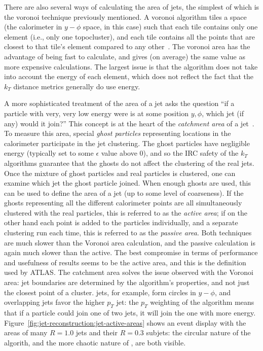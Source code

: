 There are also several ways of calculating the area of jets, the simplest of which is the voronoi technique previously mentioned. A voronoi algorithm tiles a space (the calorimeter in $y-\phi$ space, in this case) such that each tile contains only one element (i.e., only one topocluster), and each tile contains all the points that are closest to that tile's element compared to any other~\cite{catchmentarea}. The voronoi area has the advantage of being fast to calculate, and gives (on average) the same value as more expensive calculations. The largest issue is that the algorithm does not take into account the energy of each element, which does not reflect the fact that the $k_T$ distance metrics generally do use energy.

A more sophisticated treatment of the area of a jet asks the question ``if a particle with very, very low energy were is at some position $y,\phi$, which jet (if any) would it join?'' This concept is at the heart of the \textit{catchment area} of a jet~\cite{catchmentarea}. To measure this area, special \textit{ghost particles} representing locations in the calorimeter participate in the jet clustering. The ghost particles have negligible energy (typically set to some $\epsilon$ value above 0), and so the IRC safety of the $k_T$ algorithms guarantee that the ghosts do not affect the clustering of the real jets. Once the mixture of ghost particles and real particles is clustered, one can examine which jet the ghost particle joined. When enough ghosts are used, this can be used to define the area of a jet (up to some level of coarseness). If the ghosts representing all the different calorimeter points are all simultaneously clustered with the real particles, this is referred to as the \textit{active area}; if on the other hand each point is added to the particles individually, and a separate clustering run each time, this is referred to as the \textit{passive area}. Both techniques are much slower than the Voronoi area calculation, and the passive calculation is again much slower than the active. The best compromise in terms of performance and usefulness of results seems to be the active area, and this is the definition used by ATLAS. The catchment area solves the issue observed with the Voronoi area: jet boundaries are determined by the algorithm's properties, and not just the closest point of a cluster. \Antikt jets, for example, form circles in $y-\phi$, and overlapping jets favor the higher $p_T$ jet: the $p_T$ weighting of the algorithm means that if a particle could join one of two jets, it will join the one with more energy. Figure~\ref{fig:jet-reconstruction:jet-active-areas} shows an event display with the areas of many \antikt $R=1.0$ jets and their \kt $R=0.3$ subjets: the circular nature of the \antikt algorith, and the more chaotic nature of \kt, are both visible.

